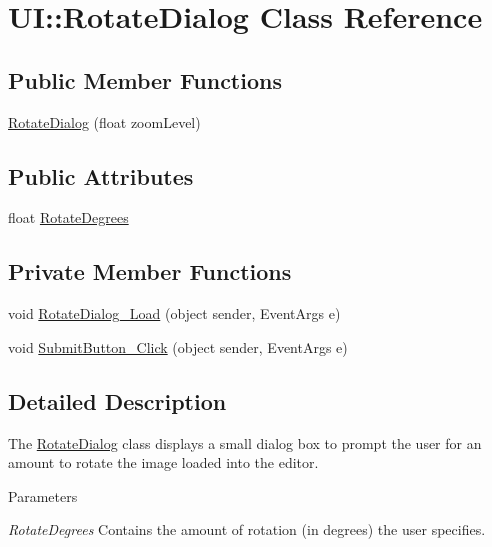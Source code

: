 \hypertarget{class_u_i_1_1_rotate_dialog}{
\section{UI::RotateDialog Class Reference}
\label{class_u_i_1_1_rotate_dialog}
}
\subsection*{Public Member Functions}
\begin{DoxyCompactItemize}
\item 
\hyperlink{class_u_i_1_1_rotate_dialog_a6bc941e68844f6663d1c76e3bb93dfdd}{RotateDialog} (float zoomLevel)
\end{DoxyCompactItemize}
\subsection*{Public Attributes}
\begin{DoxyCompactItemize}
\item 
float \hyperlink{class_u_i_1_1_rotate_dialog_a6ea5257142dfe12543d77ab37bdf0edc}{RotateDegrees}
\end{DoxyCompactItemize}
\subsection*{Private Member Functions}
\begin{DoxyCompactItemize}
\item 
void \hyperlink{class_u_i_1_1_rotate_dialog_a81382e5dea746430a971d60d9c7d4ab5}{RotateDialog\_\-Load} (object sender, EventArgs e)
\item 
void \hyperlink{class_u_i_1_1_rotate_dialog_ac7b57eb47857579ea2ee9be19d92c032}{SubmitButton\_\-Click} (object sender, EventArgs e)
\end{DoxyCompactItemize}


\subsection{Detailed Description}
The \hyperlink{class_u_i_1_1_rotate_dialog}{RotateDialog} class displays a small dialog box to prompt the user for an amount to rotate the image loaded into the editor.


\begin{DoxyParams}{Parameters}
\item[{\em RotateDegrees}]Contains the amount of rotation (in degrees) the user specifies. \end{DoxyParams}


